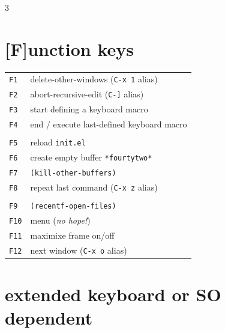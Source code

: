 \documentclass[11pt,landscape,a4paper]{article}
\begin{document}
\begin{multicols}{3}
\section{[F]unction keys}


\begin{tabular}{@{}ll@{}}
\verb!F1!	  & {\color{orange} delete-other-windows} (\verb|C-x 1| alias)\\
\verb!F2!		& {\color{orange} abort-recursive-edit} (\verb|C-]| alias)\\
\verb!F3!   & start defining a keyboard macro\\ 
\verb!F4!   & end / execute last-defined keyboard macro\\
\\  
\verb!F5!   & {\color{darkred} reload \verb|init.el|}\\ 
\verb!F6!   & {\color{darkred} create empty buffer \verb|*fourtytwo*|}\\ 
\verb!F7!		& {\color{orange}\verb|(kill-other-buffers)|}\\ 
\verb!F8!   & {\color{orange} repeat last command} (\verb|C-x z| alias)\\ 
\\
\verb!F9!		& {\color{orange} \verb|(recentf-open-files)|}\\ 
\verb!F10!	& menu (\emph{no hope!})\\ 
\verb!F11!	& maximixe frame on/off\\ 
\verb!F12!  & {\color{orange} next window} (\verb|C-x o| alias)\\ %
\end{tabular}

\vspace{1em}

\section{extended keyboard or SO dependent}


\end{multicols}
\end{document}
